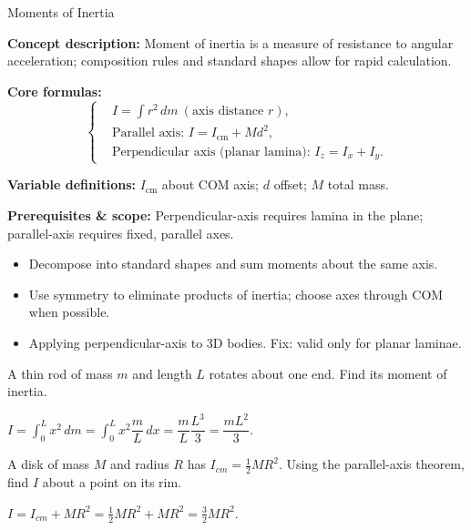 \begin{KnowledgePoint}{Moments of Inertia \Extension}
  \KPFormulas
  \begin{formulabox}
  \textbf{Concept description:} Moment of inertia is a measure of resistance to angular acceleration; composition rules and standard shapes allow for rapid calculation.
  
  \textbf{Core formulas:}
  \[
  \left\{\begin{aligned}
    &I=\int r^2\,dm\ (\text{axis distance }r),\\
    &\text{Parallel axis: } I=I_{\text{cm}}+Md^2,\\
    &\text{Perpendicular axis (planar lamina): } I_z=I_x+I_y.
  \end{aligned}\right.
  \]
  
  \textbf{Variable definitions:} $I_{\text{cm}}$ about COM axis; $d$ offset; $M$ total mass.
  
  
  \textbf{Prerequisites \& scope:} Perpendicular-axis requires lamina in the plane; parallel-axis requires fixed, parallel axes.
  \end{formulabox}
  
  \KPHeuristics
  \begin{heuristicsbox}
  \begin{itemize}[leftmargin=*]
    \item Decompose into standard shapes and sum moments about the same axis.
    \item Use symmetry to eliminate products of inertia; choose axes through COM when possible.
  \end{itemize}
  \vspace{0.4em}
  \begin{itemize}[leftmargin=*]
    \item Applying perpendicular-axis to 3D bodies. Fix: valid only for planar laminae.
  \end{itemize}
  \end{heuristicsbox}
  
  \KPProblems
\begin{cheatproblem}
  A thin rod of mass $m$ and length $L$ rotates about one end. Find its moment of inertia.
\begin{solutionbox}
  $I=\int_0^L x^2\,dm=\int_0^L x^2\dfrac{m}{L}\,dx=\dfrac{m}{L}\dfrac{L^3}{3}=\dfrac{mL^2}{3}$.
\end{solutionbox}
\end{cheatproblem}
\begin{cheatproblem}
  A disk of mass $M$ and radius $R$ has $I_{cm}=\tfrac12 MR^2$. Using the parallel-axis theorem, find $I$ about a point on its rim.
\begin{solutionbox}
  $I=I_{cm}+MR^2=\tfrac12 MR^2+MR^2=\tfrac32 MR^2$.
\end{solutionbox}
\end{cheatproblem}
\end{KnowledgePoint}

